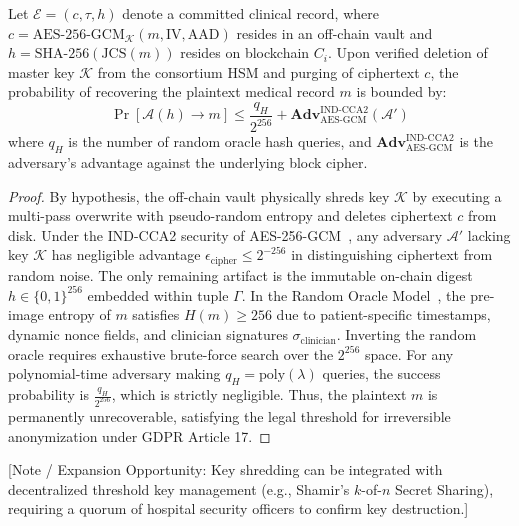 \begin{theorem}
\label{thm:statutory_erasure}
Let $\mathcal{E} = (c, \tau, h)$ denote a committed clinical record, where $c = \text{AES-256-GCM}_{\mathcal{K}}(m, \text{IV}, \text{AAD})$ resides in an off-chain vault and $h = \text{SHA-256}(\text{JCS}(m))$ resides on blockchain $C_i$. Upon verified deletion of master key $\mathcal{K}$ from the consortium HSM and purging of ciphertext $c$, the probability of recovering the plaintext medical record $m$ is bounded by:
\begin{equation}
\Pr[\mathcal{A}(h) \to m] \le \frac{q_H}{2^{256}} + \mathbf{Adv}_{\text{AES-GCM}}^{\text{IND-CCA2}}(\mathcal{A}')
\end{equation}
where $q_H$ is the number of random oracle hash queries, and $\mathbf{Adv}_{\text{AES-GCM}}^{\text{IND-CCA2}}$ is the adversary's advantage against the underlying block cipher.
\end{theorem}

\begin{proof}
By hypothesis, the off-chain vault physically shreds key $\mathcal{K}$ by executing a multi-pass overwrite with pseudo-random entropy and deletes ciphertext $c$ from disk. Under the IND-CCA2 security of AES-256-GCM~\cite{bellare2000authenticated, dworkin2007recommendation}, any adversary $\mathcal{A}'$ lacking key $\mathcal{K}$ has negligible advantage $\epsilon_{\text{cipher}} \le 2^{-256}$ in distinguishing ciphertext from random noise. The only remaining artifact is the immutable on-chain digest $h \in \{0,1\}^{256}$ embedded within tuple $\Gamma$. In the Random Oracle Model~\cite{bellare1993random}, the pre-image entropy of $m$ satisfies $H(m) \ge 256$ due to patient-specific timestamps, dynamic nonce fields, and clinician signatures $\sigma_{\text{clinician}}$. Inverting the random oracle requires exhaustive brute-force search over the $2^{256}$ space. For any polynomial-time adversary making $q_H = \text{poly}(\lambda)$ queries, the success probability is $\frac{q_H}{2^{256}}$, which is strictly negligible. Thus, the plaintext $m$ is permanently unrecoverable, satisfying the legal threshold for irreversible anonymization under GDPR Article 17.
\end{proof}

[Note / Expansion Opportunity: Key shredding can be integrated with decentralized threshold key management (e.g., Shamir's $k$-of-$n$ Secret Sharing), requiring a quorum of hospital security officers to confirm key destruction.]
